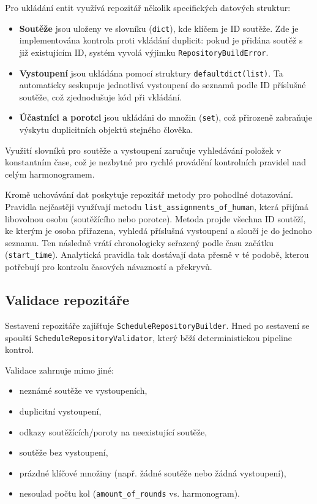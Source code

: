 \documentclass[czech, kiv, ba, he, iso690alph, pdf]{fasthesis}
\begin{document}
				Pro ukládání entit využívá repozitář několik specifických datových struktur:
				\begin{itemize}
					\item \textbf{Soutěže} jsou uloženy ve slovníku (\texttt{dict}), kde klíčem je ID soutěže. Zde je implementována kontrola proti vkládání duplicit: pokud je přidána soutěž s již existujícím ID, systém vyvolá výjimku \texttt{RepositoryBuildError}.
					\item \textbf{Vystoupení} jsou ukládána pomocí struktury \texttt{defaultdict(list)}. Ta automaticky seskupuje jednotlivá vystoupení do seznamů podle ID příslušné soutěže, což zjednodušuje kód při vkládání.
					\item \textbf{Účastníci a porotci} jsou ukládáni do množin (\texttt{set}), což přirozeně zabraňuje výskytu duplicitních objektů stejného člověka.
				\end{itemize}
			
				Využití slovníků pro soutěže a vystoupení zaručuje vyhledávání položek v konstantním čase, což je nezbytné pro rychlé provádění kontrolních pravidel nad celým harmonogramem.
			
				Kromě uchovávání dat poskytuje repozitář metody pro pohodlné dotazování. Pravidla nejčastěji využívají metodu \texttt{list\_\allowbreak{}assignments\_\allowbreak{}of\_\allowbreak{}human}, která přijímá libovolnou osobu (soutěžícího nebo porotce). Metoda projde všechna ID soutěží, ke kterým je osoba přiřazena, vyhledá příslušná vystoupení a sloučí je do jednoho seznamu. Ten následně vrátí chronologicky seřazený podle času začátku (\texttt{start\_time}). Analytická pravidla tak dostávají data přesně v té podobě, kterou potřebují pro kontrolu časových návazností a překryvů.
	
			\subsection{Validace repozitáře}
				Sestavení repozitáře zajišťuje \texttt{ScheduleRepositoryBuilder}. Hned po sestavení se spouští \texttt{ScheduleRepositoryValidator}, který běží deterministickou pipeline kontrol.
	
				Validace zahrnuje mimo jiné:
				\begin{itemize}
					\item neznámé soutěže ve vystoupeních,
					\item duplicitní vystoupení,
					\item odkazy soutěžících/poroty na neexistující soutěže,
					\item soutěže bez vystoupení,
					\item prázdné klíčové množiny (např. žádné soutěže nebo žádná vystoupení),
					\item nesoulad počtu kol (\texttt{amount\_of\_rounds} vs. harmonogram).
				\end{itemize}
	
\end{document}
